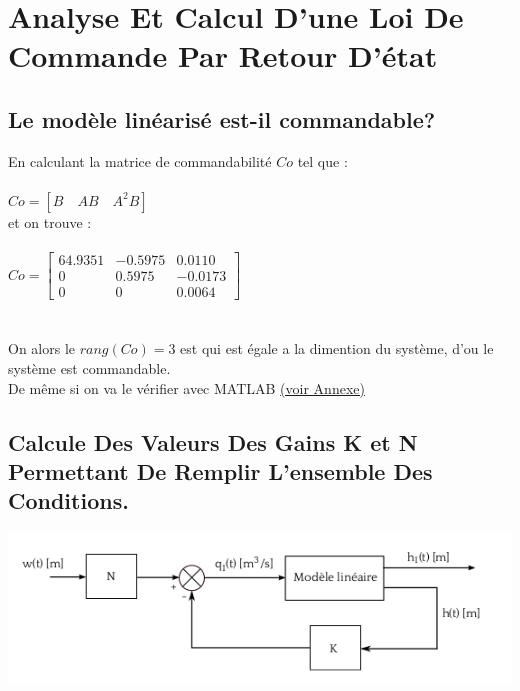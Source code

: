 \chapter{Analyse  Et Calcul  D’une Loi De Commande  Par Retour  D’état }
 \section{Le modèle linéarisé est-il commandable?}
 En calculant la matrice de commandabilité $Co$ tel que : \\\\
 $Co=[B\quad AB \quad A^{2}B]$\\
 et on trouve :\\\\
 
 $Co=\begin{bmatrix} 
64.9351 & -0.5975 & 0.0110 \\
0 & 0.5975 & -0.0173 \\
0 & 0 & 0.0064  
\end{bmatrix}$\\\\\\
 
On alors le $rang(Co)=3$ est qui est égale a la dimention du système, d'ou le système est commandable.\\  
De même si on va le vérifier avec MATLAB  \hyperref[section1.1]{(voir Annexe)}\label{annexe1}\\
 
 
 
 
 \section{Calcule Des Valeurs Des Gains K et N Permettant De Remplir L’ensemble Des Conditions.}
 
\begin{center}
\includegraphics[scale=0.5]{fig2.png}
\label{fig2} 
\end{center}


